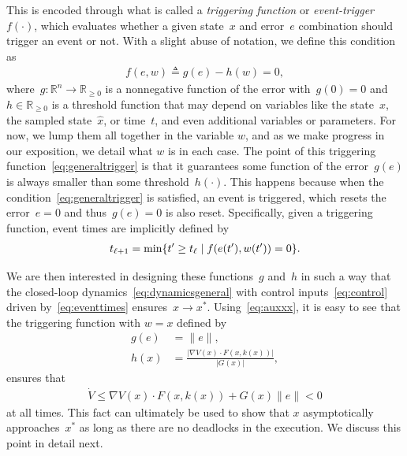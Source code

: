 \documentclass{autart}
\newcommand{\real}{{\mathbb{R}}}
\newcommand{\realnonnegative}{\mathbb{R}_{\ge 0}}
\newcommand{\TwoNorm}[1]{\|#1\|}
\renewcommand{\hat}{\widehat}
\begin{document}
{This is encoded through what is called a \emph{triggering
    function} or \emph{event-trigger}~$f(\cdot)$, which evaluates whether a given
  state~$x$ and error~$e$ combination should trigger an event or
  not. With a slight abuse of notation, we define this condition as
\begin{align}\label{eq:generaltrigger}
  f(e,w) \triangleq g(e) - h(w) = 0,
\end{align}
where~$g : \real^n \rightarrow \realnonnegative$ is a nonnegative
function of the error with~$g(0) = 0$ and~$h \in \realnonnegative$ is
a threshold function that may depend on variables like the state~$x$,
the sampled state~$\hat{x}$, or time~$t$, and even additional
variables or parameters. For now, we lump them all together in the
variable $w$, and as we make progress in our exposition, we detail
what $w$ is in each case.  The point of this triggering
function~\eqref{eq:generaltrigger} is that it guarantees some function
of the error~$g(e)$ is always smaller than some
threshold~$h(\cdot)$. This happens because when the
condition~\eqref{eq:generaltrigger} is satisfied, an event is
triggered, which resets the error~$e = 0$ and thus~$g(e) = 0$ is also
reset.  Specifically, given a triggering function, event times are
implicitly defined  by
\begin{align}\label{eq:eventtimes}
  t_{\ell+1} = \min \{ t' \geq t_\ell \hspace*{1mm} | \hspace*{1mm}
  f(e(t'),w(t')) = 0 \} .
\end{align}

We are then interested in designing these functions~$g$ and~$h$ in
such a way that the closed-loop dynamics~\eqref{eq:dynamicsgeneral}
with control inputs~\eqref{eq:control} driven by~\eqref{eq:eventtimes}
ensures~$x \rightarrow x^*$. Using~\eqref{eq:auxxx}, it is easy to see
that the triggering function with $w=x$ defined by
\begin{align*}
  g(e) &= \TwoNorm{e},
  \\
  h(x) &= \frac{|\nabla V(x) \cdot F(x,k(x))|}{|G(x)|},
\end{align*}
ensures that
\begin{align*}
  \dot V \le \nabla V(x) \cdot F(x,k(x)) + G(x) \|e\| < 0
\end{align*}
at all times. This fact can ultimately be used to show that $x$
asymptotically approaches~$x^*$ as long as there are no deadlocks in
the execution. We discuss this point in detail next.
}
\end{document}
